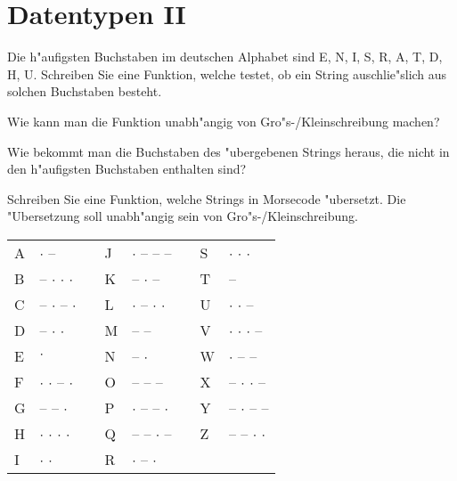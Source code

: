 \section*{Datentypen II}

\begin{aufgabe}
Die h"aufigsten Buchstaben im deutschen Alphabet sind E, N, I, S, R, A, T, D, H, U. Schreiben Sie eine Funktion, welche testet, ob ein String auschlie"slich aus solchen Buchstaben besteht.
\begin{teilaufgabe}
Wie kann man die Funktion unabh"angig von Gro"s-/Kleinschreibung machen?
\end{teilaufgabe}
\begin{teilaufgabe}
Wie bekommt man die Buchstaben des "ubergebenen Strings heraus, die nicht in den h"aufigsten Buchstaben enthalten sind?
\end{teilaufgabe}
\end{aufgabe}


\begin{aufgabe}[Morsecode]
Schreiben Sie eine Funktion, welche Strings in Morsecode "ubersetzt. Die "Ubersetzung soll unabh"angig sein von Gro"s-/Kleinschreibung.

\begin{tabular}[h]{|l|ll|l|ll|l|l|}
\hline
A&$\cdot$ --&&J&$\cdot$ -- -- --&&S&$\cdot$ $\cdot$ $\cdot$\\
B&-- $\cdot$ $\cdot$ $\cdot$&&K&-- $\cdot$ --&&T&--\\
C&-- $\cdot$ -- $\cdot$&&L&$\cdot$ -- $\cdot$ $\cdot$&&U&$\cdot$ $\cdot$ --\\
D&-- $\cdot$ $\cdot$&&M&-- --&&V&$\cdot$ $\cdot$ $\cdot$ --\\
E&$\cdot$&&N&-- $\cdot$&&W&$\cdot$ -- --\\
F&$\cdot$ $\cdot$ -- $\cdot$&&O&-- -- --&&X&-- $\cdot$ $\cdot$ --\\
G&-- -- $\cdot$&&P&$\cdot$ -- -- $\cdot$&&Y&-- $\cdot$ -- --\\
H&$\cdot$ $\cdot$ $\cdot$ $\cdot$&&Q&-- -- $\cdot$ --&&Z&-- -- $\cdot$ $\cdot$\\
I&$\cdot$ $\cdot$&&R&$\cdot$ -- $\cdot$&&&\\
\hline
\end{tabular}
\end{aufgabe}

